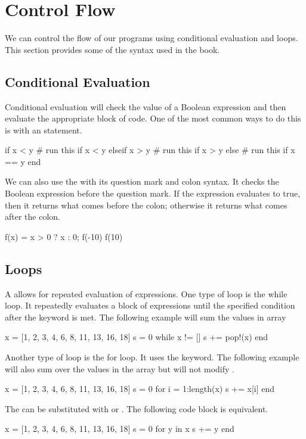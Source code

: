 \section{Control Flow}

We can control the flow of our programs using conditional evaluation and loops. This section provides some of the syntax used in the book.

\subsection{Conditional Evaluation}

Conditional evaluation will check the value of a Boolean expression and then evaluate the appropriate block of code. One of the most common ways to do this is with an  statement.
\begin{juliaverbatim}
if x < y
    # run this if x < y
elseif x > y
    # run this if x > y
else
    # run this if x == y
end
\end{juliaverbatim}
We can also use the  with its question mark and colon syntax. It checks the Boolean expression before the question mark. If the expression evaluates to true, then it returns what comes before the colon; otherwise it returns what comes after the colon.
\begin{juliaconsole}[condeval]
f(x) = x > 0 ? x : 0;
f(-10)
f(10)
\end{juliaconsole}

\subsection{Loops}

A  allows for repeated evaluation of expressions. One type of loop is the while loop. It repeatedly evaluates a block of expressions until the specified condition after the  keyword is met. The following example will sum the values in array 
\begin{juliaverbatim}
x = [1, 2, 3, 4, 6, 8, 11, 13, 16, 18]
s = 0
while x != []
    s += pop!(x)
end
\end{juliaverbatim}

Another type of loop is the for loop. It uses the  keyword. The following example will also sum over the values in the array  but will not modify .
\begin{juliaverbatim}
x = [1, 2, 3, 4, 6, 8, 11, 13, 16, 18]
s = 0
for i = 1:length(x)
    s += x[i]
end
\end{juliaverbatim}
The \jlv{=} can be substituted with  or .
The following code block is equivalent.
\begin{juliaverbatim}
x = [1, 2, 3, 4, 6, 8, 11, 13, 16, 18]
s = 0
for y in x
    s += y
end
\end{juliaverbatim}


